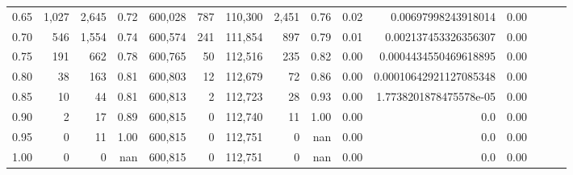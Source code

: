 \begin{tabular}{rrrrrrrrrrrrrrr}
0.65 &    1,027 &   2,645 &  0.72 &  600,028 &      787 &  110,300 &    2,451 &  0.76 &  0.02 &     0.00697998243918014 &      0.00 \\
0.70 &      546 &   1,554 &  0.74 &  600,574 &      241 &  111,854 &      897 &  0.79 &  0.01 &    0.002137453326356307 &      0.00 \\
0.75 &      191 &     662 &  0.78 &  600,765 &       50 &  112,516 &      235 &  0.82 &  0.00 &   0.0004434550469618895 &      0.00 \\
0.80 &       38 &     163 &  0.81 &  600,803 &       12 &  112,679 &       72 &  0.86 &  0.00 &  0.00010642921127085348 &      0.00 \\
0.85 &       10 &      44 &  0.81 &  600,813 &        2 &  112,723 &       28 &  0.93 &  0.00 &  1.7738201878475578e-05 &      0.00 \\
0.90 &        2 &      17 &  0.89 &  600,815 &        0 &  112,740 &       11 &  1.00 &  0.00 &                     0.0 &      0.00 \\
0.95 &        0 &      11 &  1.00 &  600,815 &        0 &  112,751 &        0 &   nan &  0.00 &                     0.0 &      0.00 \\
1.00 &        0 &       0 &   nan &  600,815 &        0 &  112,751 &        0 &   nan &  0.00 &                     0.0 &      0.00 \\
\bottomrule
\end{tabular}
